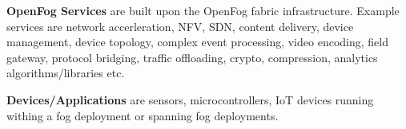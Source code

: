 \textbf{OpenFog Services} are built upon the OpenFog fabric infrastructure. Example services are network accerleration, NFV, SDN, content delivery, device management, device topology, complex event processing, video encoding, field gateway, protocol bridging, traffic offloading, crypto, compression, analytics algorithms/libraries etc.\cite[p. 8]{OpenFog}

\textbf{Devices/Applications} are sensors, microcontrollers, IoT devices running withing a fog deployment or spanning fog deployments.
 